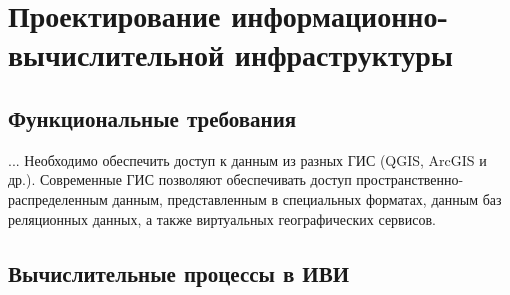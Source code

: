 \documentclass[732,14pt,final]{studrep}
\begin{document}
\section{Проектирование информационно-вычислительной инфраструктуры}
\subsection{Функциональные требования}


... Необходимо обеспечить доступ к данным из разных ГИС (QGIS, ArcGIS и др.). Современные ГИС позволяют обеспечивать доступ пространственно-распределенным данным, представленным в специальных форматах, данным баз реляционных данных, а также виртуальных географических сервисов.

\subsection{Вычислительные процессы в ИВИ}\label{sec:ivi}
\end{document}
